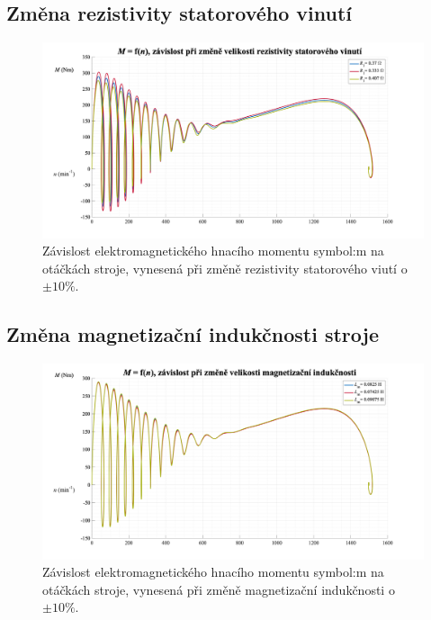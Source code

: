 \documentclass[a4paper, twoside, 11pt]{article}
\newcommand{\fbar}{\FloatBarrier}
\begin{document}
    \subsection{Změna rezistivity statorového vinutí}
        \begin{figure}[htbp!]
            \centering
            \includegraphics[width=1\textwidth]{src/png/mh_dyn_nGraphR1.png}
            \caption{Závislost elektromagnetického hnacího momentu \gls{symbol:m} na otáčkách stroje, vynesená při změně rezistivity statorového viutí o $\pm 10 \%$.}
            \label{fig:mh_dyn_nGraphR1}
        \end{figure}

\newpage

    \fbar
    \subsection{Změna magnetizační indukčnosti stroje}
        \begin{figure}[htbp!]
            \centering
            \includegraphics[width=1\textwidth]{src/png/mh_dyn_nGraphLm.png}
            \caption{Závislost elektromagnetického hnacího momentu \gls{symbol:m} na otáčkách stroje, vynesená při změně magnetizační indukčnosti o $\pm 10 \%$.}
            \label{fig:mh_dyn_nGraphLm}
        \end{figure}
\end{document}
